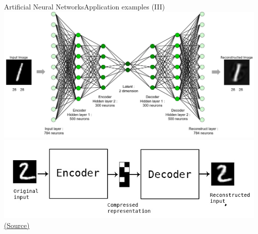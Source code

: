 \documentclass[10pt,compress]{beamer} %
\begin{document}
\begin{frame}{Artificial Neural Networks}{Application examples (III)}
	\centering\includegraphics[width=0.75\linewidth]{figs/autoencoder.png}\\
	\centering\includegraphics[width=0.3\linewidth]{figs/autoencoder2.png}\\
	\scriptsize\href{http://i-systems.github.io/HSE545/machine\%20learning\%20all/KIMM/06\_KIMM\_Autoencoder.html}{(Source)}
\end{frame}

\end{document}
